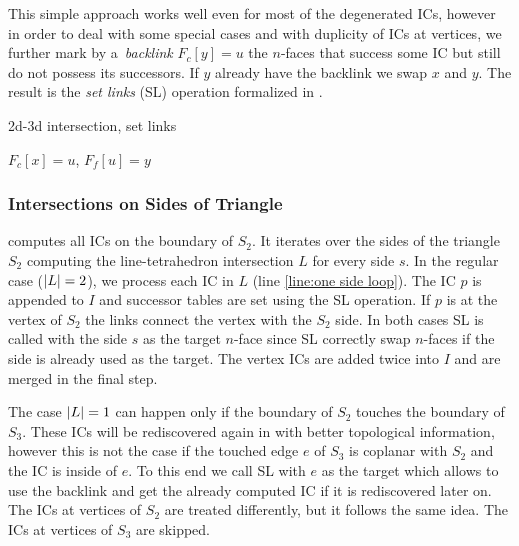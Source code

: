 This simple approach works well even for most of the degenerated ICs, however in order to deal with some special cases and 
with duplicity of ICs at vertices, we further mark by a~\emph{backlink} $F_c[y]=u$ the $n$-faces that success some IC but still do not possess its successors.
If $y$ already have the backlink we swap $x$ and $y$. The result is the \emph{set links} (SL) operation formalized in .
\begin{algorithm}
  \caption{2d-3d intersection, set links}
  \label{algo:set_links}
  
  \DontPrintSemicolon  
  $F_c[x]=u$, $F_f[u]=y$\;
\end{algorithm}





\subsubsection{Intersections on Sides of Triangle}
 computes all ICs on the boundary of $S_2$.  It iterates over the sides of the triangle $S_2$ 
computing  the line-tetrahedron intersection $L$ for every side $s$. 
In the regular case ($\left|L\right|=2$), we process each IC in $L$ (line \ref{line:one side loop}).
The IC $p$ is appended to $I$ and successor tables are set using the SL operation. If $p$ is at the vertex of
$S_2$ the links connect the vertex with the $S_2$ side. In both cases SL  is called with the side $s$ as the target $n$-face
since SL correctly swap $n$-faces if the side is already used as the target. The vertex ICs are added twice into $I$ and are merged
in the final step.

The case $\left|L\right|=1$ can happen only if the boundary of $S_2$ touches the boundary of $S_3$. These ICs will be 
rediscovered again in  with better topological information, however this is not the 
case if the touched edge $e$ of $S_3$ is coplanar with $S_2$ and the IC is inside of $e$.
To this end we call SL with $e$ as the target which allows to use the backlink and get the already computed IC if it is rediscovered later on.
The ICs at vertices of $S_2$ are treated differently, but it follows the same idea. The ICs at vertices of $S_3$ are skipped.

